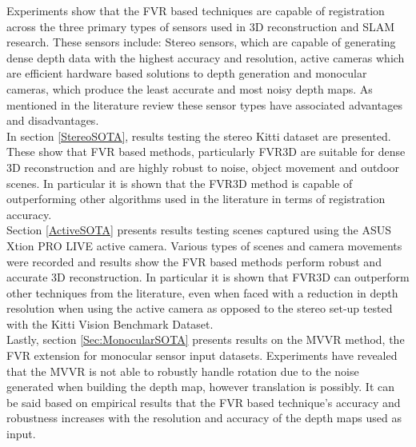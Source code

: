 


Experiments show that the FVR based techniques are capable of registration across the three primary types of sensors used in 3D reconstruction and SLAM research. These sensors include: Stereo sensors, which are capable of generating dense depth data with the highest accuracy and resolution, active cameras which are efficient hardware based solutions to depth generation and monocular cameras, which produce the least accurate and most noisy depth maps. As mentioned in the literature review these sensor types have associated advantages and disadvantages. \\

In section \ref{StereoSOTA}, results testing the stereo Kitti dataset are presented. These show that FVR based methods, particularly FVR3D are suitable for dense 3D reconstruction and are highly robust to noise, object movement and outdoor scenes. In particular it is shown that the FVR3D method is capable of outperforming other algorithms used in the literature in terms of registration accuracy. \\

Section \ref{ActiveSOTA} presents results testing scenes captured using the ASUS Xtion PRO LIVE active camera. Various types of scenes and camera movements were recorded and results show the FVR based methods perform robust and accurate 3D reconstruction. In particular it is shown that FVR3D can outperform other techniques from the literature, even when faced with a reduction in depth resolution when using the active camera as opposed to the stereo set-up tested with the Kitti Vision Benchmark Dataset.  \\

Lastly, section \ref{Sec:MonocularSOTA} presents results on the MVVR method, the FVR extension for monocular sensor input datasets. Experiments have revealed that the MVVR is not able to robustly handle rotation due to the noise generated when building the depth map, however translation is possibly. It can be said based on empirical results that the FVR based technique's accuracy and robustness increases with the resolution and accuracy of the depth maps used as input. \\
